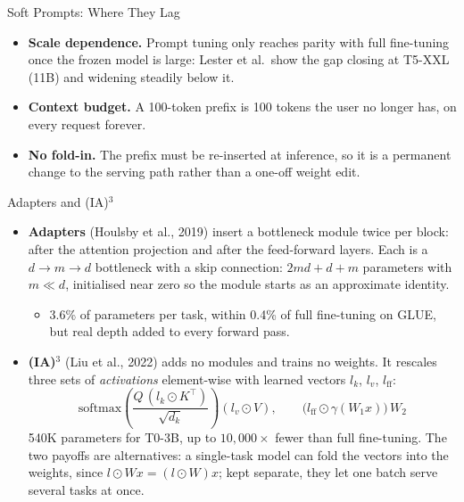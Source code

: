 \begin{frame}[t]{Soft Prompts: Where They Lag}
  \begin{itemize}\itemsep0.6em
    \item[\textcolor{red}{$\blacktriangleright$}] \textbf{Scale dependence.} Prompt tuning only reaches parity with full fine-tuning once the frozen model is large: Lester et al.\ show the gap closing at T5-XXL (11B) and widening steadily below it.
    \item[\textcolor{red}{$\blacktriangleright$}] \textbf{Context budget.} A 100-token prefix is 100 tokens the user no longer has, on every request forever.
    \item[\textcolor{red}{$\blacktriangleright$}] \textbf{No fold-in.} The prefix must be re-inserted at inference, so it is a permanent change to the serving path rather than a one-off weight edit.
  \end{itemize}
\end{frame}

\begin{frame}[t]{Adapters and (IA)$^3$}
  \begin{itemize}\itemsep0.35em
    \item[\textcolor{red}{$\blacktriangleright$}] \textbf{Adapters} (Houlsby et al., 2019) insert a bottleneck module twice per block: after the attention projection and after the feed-forward layers. Each is a $d \to m \to d$ bottleneck with a skip connection: $2md + d + m$ parameters with $m \ll d$, initialised near zero so the module starts as an approximate identity.
      \begin{itemize}
        \item 3.6\% of parameters per task, within 0.4\% of full fine-tuning on GLUE, but real depth added to every forward pass.
      \end{itemize}
    \item[\textcolor{red}{$\blacktriangleright$}] \textbf{(IA)$^3$} (Liu et al., 2022) adds no modules and trains no weights. It rescales three sets of \emph{activations} element-wise with learned vectors $l_k$, $l_v$, $l_{\mathrm{ff}}$:
      \[
        \mathrm{softmax}\!\left(\frac{Q\,(l_k \odot K^{\top})}{\sqrt{d_k}}\right)(l_v \odot V),
        \qquad
        \big(l_{\mathrm{ff}} \odot \gamma(W_1 x)\big)\,W_2
      \]
      540K parameters for T0-3B, up to $10{,}000\times$ fewer than full fine-tuning. The two payoffs are alternatives: a single-task model can fold the vectors into the weights, since $l \odot Wx = (l \odot W)x$; kept separate, they let one batch serve several tasks at once.
  \end{itemize}
\end{frame}

